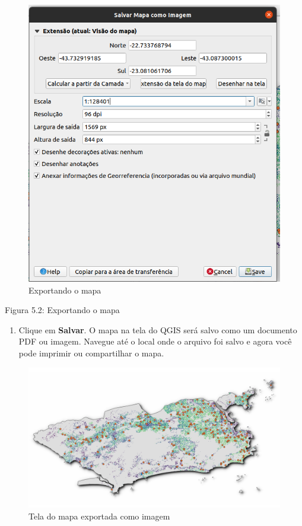 \documentclass[
  portuguese,
]{krantz}
\providecommand{\tightlist}{%
  \setlength{\itemsep}{0pt}\setlength{\parskip}{0pt}}
\begin{document}
\begin{figure}
\centering
\includegraphics{media/modulo5/export-map-canvas.png}
\caption{Exportando o mapa}
\end{figure}

Figura 5.2: Exportando o mapa

\begin{enumerate}
\def\labelenumi{\arabic{enumi}.}
\setcounter{enumi}{2}
\tightlist
\item
  Clique em \textbf{Salvar}. O mapa na tela do QGIS será salvo como um documento PDF ou imagem. Navegue até o local onde o arquivo foi salvo e agora você pode imprimir ou compartilhar o mapa.
\end{enumerate}

\begin{figure}
\centering
\includegraphics{media/modulo5/exported-map-canvas.png}
\caption{Tela do mapa exportada como imagem}
\end{figure}
\end{document}
